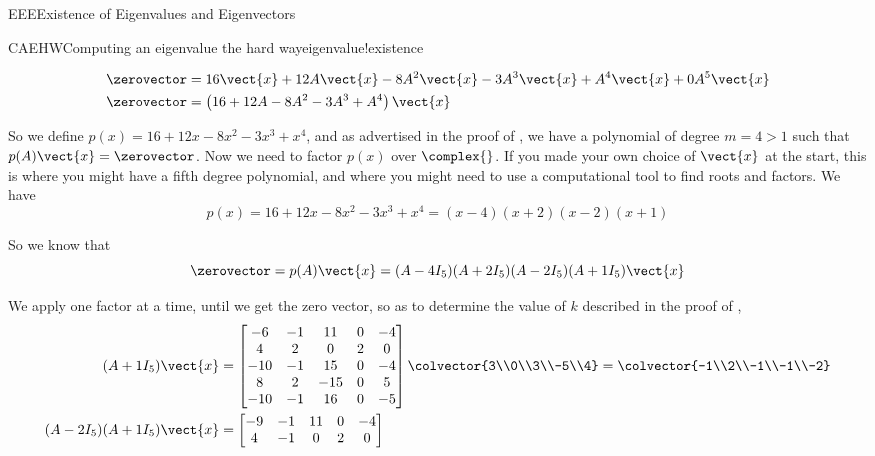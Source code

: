 \begin{subsect}{EEE}{Existence of Eigenvalues and Eigenvectors}
\begin{example}{CAEHW}{Computing an eigenvalue the hard way}{eigenvalue!existence}
\begin{para}
%
\begin{align*}
\zerovector&=16\vect{x}+12A\vect{x}-8A^2\vect{x}-3A^3\vect{x}+A^4\vect{x}+0A^5\vect{x}\\
\zerovector&=\left(16+12A-8A^2-3A^3+A^4\right)\vect{x}
\end{align*}
\end{para}
%
\begin{para}So we define $p(x)=16+12x-8x^2-3x^3+x^4$, and as advertised in the proof of , we have a polynomial of degree $m=4>1$ such that $p(A)\vect{x}=\zerovector$.  Now we need to factor $p(x)$ over $\complex{\null}$.  If you made your own choice of $\vect{x}$ at the start, this is where you might have a fifth degree polynomial, and where you might need to use a computational tool to find roots and factors.  We have
%
\begin{equation*}
p(x)=16+12x-8x^2-3x^3+x^4=(x-4)(x+2)(x-2)(x+1)
\end{equation*}
\end{para}
%
\begin{para}So we know that
%
\begin{equation*}
\zerovector=p(A)\vect{x}=(A-4I_5)(A+2I_5)(A-2I_5)(A+1I_5)\vect{x}
\end{equation*}
\end{para}
%
\begin{para}We apply one factor at a time, until we get the zero vector, so as to determine the value of $k$ described in the proof of ,
%
\begin{align*}
(A+1I_5)\vect{x}&=
\begin{bmatrix}
-6 & -1 & 11 & 0 & -4\\
4 & 2 & 0 & 2 & 0\\
-10 & -1 & 15 & 0 & -4\\
8 & 2 & -15 & 0 & 5\\
-10 & -1 & 16 & 0 & -5
\end{bmatrix}
\colvector{3\\0\\3\\-5\\4}
=
\colvector{-1\\2\\-1\\-1\\-2}\\
%
(A-2I_5)(A+1I_5)\vect{x}&=
\begin{bmatrix}
-9 & -1 & 11 & 0 & -4\\
4 & -1 & 0 & 2 & 0\\

\end{bmatrix}
\end{align*}
\end{para}
\end{example}
\end{subsect}
